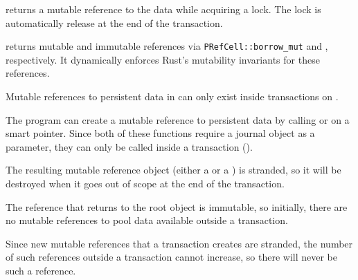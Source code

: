  returns a mutable reference to the data while
acquiring a lock.  The lock is automatically release at the end of the
transaction.

 returns mutable and immutable references via\linebreak
\texttt{PRefCell::borrow\_mut} and ,
respectively.  It dynamically enforces Rust's mutability
invariants for these references.


\begin{invar}
  \label{inv:mutable-in-tx-only}
  Mutable references to persistent data in  can only exist inside transactions on .
\end{invar}

\begin{discuss}
  The program can create a mutable reference to persistent data by calling
   or  on a smart pointer.  Since both of
  these functions require a journal object as a parameter, they can only be called inside a
  transaction ().

  The resulting mutable reference object (either a  or a
  ) is stranded, so it will be destroyed when it goes out of
  scope at the end of the transaction.
  
  The reference that  returns to the root object is immutable, so
  initially, there are no mutable references to pool data available outside a
  transaction.

  Since new mutable references that a transaction creates are stranded, the
  number of such references outside a transaction cannot increase, so there
  will never be such a reference.
\end{discuss}

